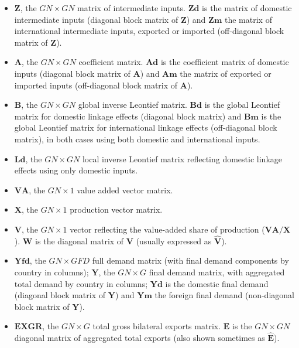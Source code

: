 \begin{itemize}
\tightlist
\item
  \(\mathbf{Z}\), the \(GN \times GN\) matrix of intermediate inputs.
  \(\mathbf{Zd}\) is the matrix of domestic intermediate inputs (diagonal block
  matrix of \(\mathbf{Z}\)) and \(\mathbf{Zm}\) the matrix of international
  intermediate inputs, exported or imported (off-diagonal block matrix of
  \(\mathbf{Z}\)).
\item
  \(\mathbf{A}\), the \(GN \times GN\) coefficient matrix. \(\mathbf{Ad}\) is
  the coefficient matrix of domestic inputs (diagonal block matrix of
  \(\mathbf{A}\)) and \(\mathbf{Am}\) the matrix of exported or imported inputs
  (off-diagonal block matrix of \(\mathbf{A}\)).
\item
  \(\mathbf{B}\), the \(GN \times GN\) global inverse Leontief matrix.
  \(\mathbf{Bd}\) is the global Leontief matrix for domestic linkage effects
  (diagonal block matrix) and \(\mathbf{Bm}\) is the global Leontief matrix
  for international linkage effects (off-diagonal block matrix), in both
  cases using both domestic and international inputs.
\item
  \(\mathbf{Ld}\), the \(GN \times GN\) local inverse Leontief matrix
  reflecting domestic linkage effects using only domestic inputs.
\item
  \(\mathbf{VA}\), the \(GN \times 1\) value added vector matrix.
\item
  \(\mathbf{X}\), the \(GN \times 1\) production vector matrix.
\item
  \(\mathbf{V}\), the \(GN \times 1\) vector reflecting the value-added
  share of production (\(\mathbf{VA}/\mathbf{X}\)). \(\mathbf{W}\) is the diagonal
  matrix of \(\mathbf{V}\) (usually expressed as \(\hat{\mathbf{V}}\)).
\item
  \(\mathbf{Yfd}\), the \(GN \times GFD\) full demand matrix (with final
  demand components by country in columns); \(\mathbf{Y}\), the \(GN \times G\)
  final demand matrix, with aggregated total demand by country in columns;
  \(\mathbf{Yd}\) is the domestic final demand (diagonal block matrix of
  \(\mathbf{Y}\)) and \(\mathbf{Ym}\) the foreign final demand (non-diagonal block
  matrix of \(\mathbf{Y}\)).
\item
  \(\mathbf{EXGR}\), the \(GN \times G\) total gross bilateral exports
  matrix. \(\mathbf{E}\) is the \(GN \times GN\) diagonal matrix of aggregated
  total exports (also shown sometimes as \(\hat{\mathbf{E}}\)).
\end{itemize}

